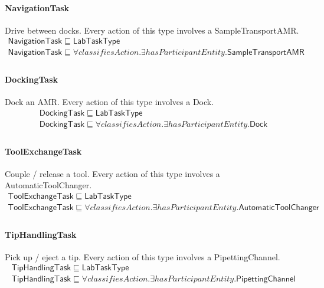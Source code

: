 \documentclass[10pt]{article}
\begin{document}
\paragraph{NavigationTask} Drive between docks. Every action of this type involves a SampleTransportAMR.
\[\begin{array}{l}
\mathsf{NavigationTask} \sqsubseteq  \mathsf{LabTaskType} \\
\mathsf{NavigationTask} \sqsubseteq  \forall \mathit{classifiesAction}.\exists \mathit{hasParticipantEntity}.\mathsf{SampleTransportAMR} \\
\end{array}\]
\paragraph{DockingTask} Dock an AMR. Every action of this type involves a Dock.
\[\begin{array}{l}
\mathsf{DockingTask} \sqsubseteq  \mathsf{LabTaskType} \\
\mathsf{DockingTask} \sqsubseteq  \forall \mathit{classifiesAction}.\exists \mathit{hasParticipantEntity}.\mathsf{Dock} \\
\end{array}\]
\paragraph{ToolExchangeTask} Couple / release a tool. Every action of this type involves a AutomaticToolChanger.
\[\begin{array}{l}
\mathsf{ToolExchangeTask} \sqsubseteq  \mathsf{LabTaskType} \\
\mathsf{ToolExchangeTask} \sqsubseteq  \forall \mathit{classifiesAction}.\exists \mathit{hasParticipantEntity}.\mathsf{AutomaticToolChanger} \\
\end{array}\]
\paragraph{TipHandlingTask} Pick up / eject a tip. Every action of this type involves a PipettingChannel.
\[\begin{array}{l}
\mathsf{TipHandlingTask} \sqsubseteq  \mathsf{LabTaskType} \\
\mathsf{TipHandlingTask} \sqsubseteq  \forall \mathit{classifiesAction}.\exists \mathit{hasParticipantEntity}.\mathsf{PipettingChannel} \\
\end{array}\]
\end{document}
